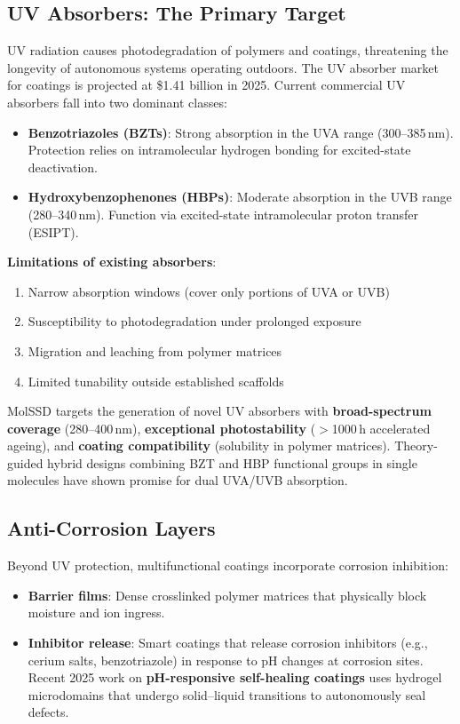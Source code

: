 \documentclass[11pt,a4paper]{article}
\begin{document}
\subsection{UV Absorbers: The Primary Target}

UV radiation causes photodegradation of polymers and coatings, threatening
the longevity of autonomous systems operating outdoors. The UV absorber
market for coatings is projected at \$1.41 billion in 2025. Current
commercial UV absorbers fall into two dominant classes:

\begin{itemize}[leftmargin=2em]
  \item \textbf{Benzotriazoles (BZTs)}: Strong absorption in the UVA range
    (300--385\,nm). Protection relies on intramolecular hydrogen bonding for
    excited-state deactivation.
  \item \textbf{Hydroxybenzophenones (HBPs)}: Moderate absorption in the
    UVB range (280--340\,nm). Function via excited-state intramolecular
    proton transfer (ESIPT).
\end{itemize}

\textbf{Limitations of existing absorbers}:
\begin{enumerate}[leftmargin=2em]
  \item Narrow absorption windows (cover only portions of UVA or UVB)
  \item Susceptibility to photodegradation under prolonged exposure
  \item Migration and leaching from polymer matrices
  \item Limited tunability outside established scaffolds
\end{enumerate}

MolSSD targets the generation of novel UV absorbers with \textbf{broad-spectrum coverage} (280--400\,nm), \textbf{exceptional photostability}
($>$1000\,h accelerated ageing), and \textbf{coating compatibility}
(solubility in polymer matrices). Theory-guided hybrid designs combining
BZT and HBP functional groups in single molecules have shown promise for
dual UVA/UVB absorption.

\subsection{Anti-Corrosion Layers}

Beyond UV protection, multifunctional coatings incorporate corrosion
inhibition:

\begin{itemize}[leftmargin=2em]
  \item \textbf{Barrier films}: Dense crosslinked polymer matrices that
    physically block moisture and ion ingress.
  \item \textbf{Inhibitor release}: Smart coatings that release corrosion
    inhibitors (e.g., cerium salts, benzotriazole) in response to pH
    changes at corrosion sites. Recent 2025 work on \textbf{pH-responsive
    self-healing coatings} uses hydrogel microdomains that undergo
    solid--liquid transitions to autonomously seal defects.
\end{itemize}
\end{document}
